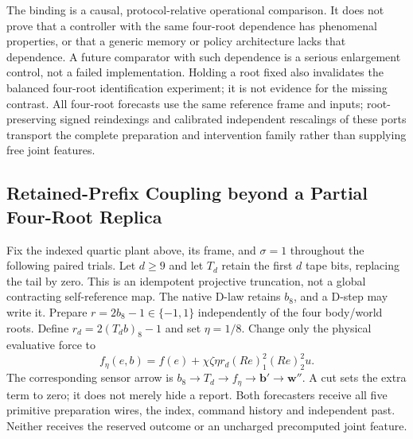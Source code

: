\documentclass[11pt,a4paper]{article}
\theoremstyle{definition}
\begin{document}
The binding is a causal, protocol-relative operational comparison. It does
not prove that a controller with the same four-root dependence has phenomenal
properties, or that a generic memory or policy architecture lacks that
dependence. A future comparator with such dependence is a serious enlargement
control, not a failed implementation. Holding a root fixed also invalidates
the balanced four-root identification experiment; it is not evidence for
the missing contrast. All four-root forecasts use the same reference frame
and inputs; root-preserving signed reindexings and calibrated independent rescalings
of these ports transport the complete
preparation and intervention family rather than supplying free joint features.


\subsection{Retained-Prefix Coupling beyond a Partial Four-Root Replica}

Fix the indexed quartic plant above, its frame, and $\sigma=1$ throughout the
following paired trials. Let $d\ge9$ and let $T_d$ retain the first $d$ tape
bits, replacing the tail by zero. This is an idempotent projective truncation,
not a global contracting self-reference map. The native D-law retains
$b_8$, and a D-step may write it. Prepare $r=2b_8-1\in\{-1,1\}$ independently
of the four body/world roots. Define $r_d=2(T_db)_8-1$ and set
$\eta=1/8$. Change only the physical evaluative force to
\[
 f_\eta(e,b)=f(e)+\chi\zeta\eta r_d (Re)_1^2(Re)_2^2u.
\]
The corresponding sensor arrow is $b_8\to T_d\to f_\eta\to\mathbf b'
\to\mathbf w''$. A cut sets the extra term to zero; it does not merely
hide a report. Both forecasters receive all five primitive preparation wires,
the index, command history and independent past. Neither receives the reserved
outcome or an uncharged precomputed joint feature.
\end{document}

